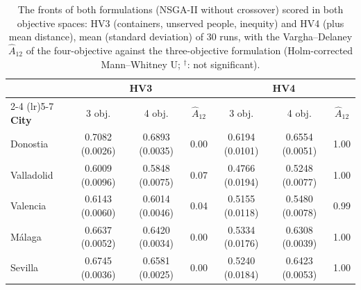 \begin{table}[htbp]
\centering
\small
\caption{The fronts of both formulations (NSGA-II without crossover) scored in both objective spaces: HV3 (containers, unserved people, inequity) and HV4 (plus mean distance), mean (standard deviation) of 30 runs, with the Vargha--Delaney $\hat{A}_{12}$ of the four-objective against the three-objective formulation (Holm-corrected Mann--Whitney U; $^\dagger$: not significant).}
\label{tab:formulation}
\begin{tabular}{lcccccc}
\toprule
& \multicolumn{3}{c}{\textbf{HV3}} & \multicolumn{3}{c}{\textbf{HV4}} \\
\cmidrule(lr){2-4} \cmidrule(lr){5-7}
\textbf{City} & 3 obj. & 4 obj. & $\hat{A}_{12}$ & 3 obj. & 4 obj. & $\hat{A}_{12}$ \\
\midrule
Donostia & 0.7082 (0.0026) & 0.6893 (0.0035) & 0.00 & 0.6194 (0.0101) & 0.6554 (0.0051) & 1.00 \\
Valladolid & 0.6009 (0.0096) & 0.5848 (0.0075) & 0.07 & 0.4766 (0.0194) & 0.5248 (0.0077) & 1.00 \\
Valencia & 0.6143 (0.0060) & 0.6014 (0.0046) & 0.04 & 0.5155 (0.0118) & 0.5480 (0.0078) & 0.99 \\
Málaga & 0.6637 (0.0052) & 0.6420 (0.0034) & 0.00 & 0.5334 (0.0176) & 0.6308 (0.0039) & 1.00 \\
Sevilla & 0.6745 (0.0036) & 0.6581 (0.0025) & 0.00 & 0.5240 (0.0184) & 0.6423 (0.0053) & 1.00 \\
\bottomrule
\end{tabular}
\end{table}
